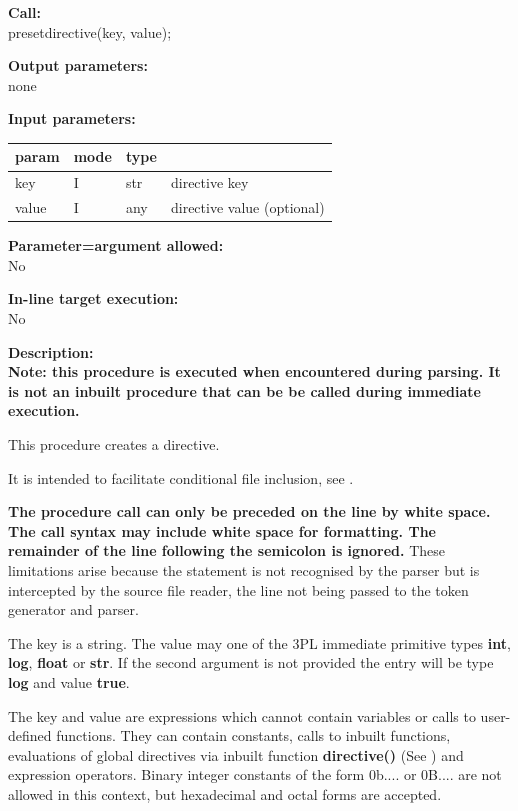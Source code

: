         {\bf Call:} \\
        presetdirective(key, value);
        
        {\bf Output parameters:} \\
        none
        
        {\bf Input parameters:} \\
        \begin{tabular}{| l | l | l | l |}
        \hline
        param  & mode     & type  & \\
        \hline \hline
        key   & I & str & directive key     \\ \hline
        value & I & any & directive value (optional)   \\ \hline
        \end{tabular}
        
        {\bf Parameter=argument allowed:} \\
        No
        
        {\bf In-line target execution:} \\
        No
        
        {\bf Description:} \\
        {\bf Note: this procedure is executed when encountered during parsing.
        It is not an inbuilt procedure that can be be called during immediate
        execution.}
        
        This procedure creates a directive.
        
        It is intended to facilitate conditional file inclusion, see
        .
        
        {\bf The procedure call can only be preceded on the line by white space.
        The call syntax may include white space for formatting. The remainder
        of the line following the semicolon is ignored.} These limitations arise
        because the statement is not recognised by the parser but is
        intercepted by the source file reader, the line not being passed to
        the token generator and parser.
        
        The key is a string. The value may one of the 3PL immediate primitive
        types {\bf int}, {\bf log}, {\bf float} or {\bf str}. If the second
        argument is not provided the entry will be type {\bf log} and value {\bf
        true}.

        The key and value are expressions which cannot contain variables or
        calls to user-defined functions. They can contain constants, calls to
        inbuilt functions, evaluations of global directives via inbuilt function
        {\bf directive()} (See ) and expression
        operators. Binary integer constants of the form 0b.... or 0B.... are not
        allowed in this context, but hexadecimal and octal forms are accepted.
        
